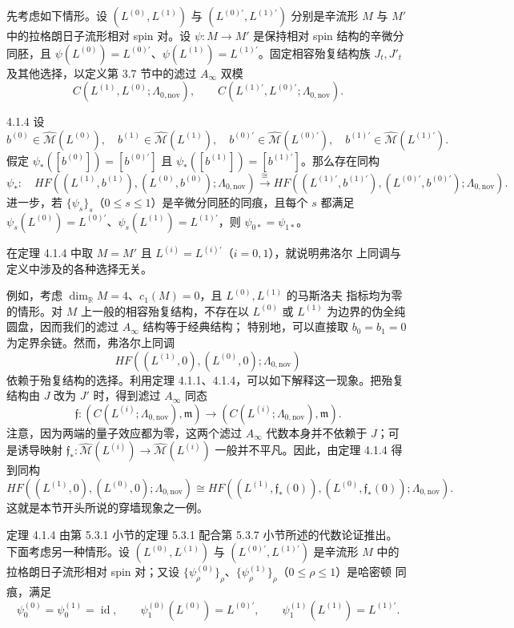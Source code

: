 先考虑如下情形。设 $(L^{(0)},L^{(1)})$ 与
$(L^{(0)'},L^{(1)'})$ 分别是辛流形 $M$ 与 $M'$ 中的拉格朗日子流形相对 spin
对。设 $\psi:M\to M'$ 是保持相对 spin 结构的辛微分同胚，且
$\psi(L^{(0)})=L^{(0)'}$、$\psi(L^{(1)})=L^{(1)'}$。固定相容殆复结构族
$J_t,J'_t$ 及其他选择，以定义第 3.7 节中的滤过 $A_\infty$ 双模
\[
  C(L^{(1)},L^{(0)};\Lambda_{0,\mathrm{nov}}),
  \qquad
  C(L^{(1)'},L^{(0)'};\Lambda_{0,\mathrm{nov}}).
\]

\begin{theorem}{4.1.4}\label{thm:4-1-4}
设
\[
  b^{(0)}\in\widehat{\mathcal M}(L^{(0)}),\quad
  b^{(1)}\in\widehat{\mathcal M}(L^{(1)}),\quad
  b^{(0)'}\in\widehat{\mathcal M}(L^{(0)'}),\quad
  b^{(1)'}\in\widehat{\mathcal M}(L^{(1)'}).
\]
假定
$\psi_*([b^{(0)}])=[b^{(0)'}]$ 且
$\psi_*([b^{(1)}])=[b^{(1)'}]$。那么存在同构
{\small
\[
  \psi_*:\quad
  HF((L^{(1)},b^{(1)}),(L^{(0)},b^{(0)});\Lambda_{0,\mathrm{nov}})
  \xrightarrow{\ \cong\ }
  HF((L^{(1)'},b^{(1)'}),(L^{(0)'},b^{(0)'});\Lambda_{0,\mathrm{nov}}).
\]
}
进一步，若 $\{\psi_s\}_s$（$0\le s\le1$）是辛微分同胚的同痕，且每个 $s$
都满足 $\psi_s(L^{(0)})=L^{(0)'}$、$\psi_s(L^{(1)})=L^{(1)'}$，则
$\psi_{0*}=\psi_{1*}$。
\end{theorem}

在定理 4.1.4 中取 $M=M'$ 且 $L^{(i)}=L^{(i)'}$（$i=0,1$），就说明弗洛尔
上同调与定义中涉及的各种选择无关。

例如，考虑 $\dim_{\mathbb R}M=4$、$c_1(M)=0$，且 $L^{(0)},L^{(1)}$ 的马斯洛夫
指标均为零的情形。对 $M$ 上一般的相容殆复结构，不存在以 $L^{(0)}$ 或
$L^{(1)}$ 为边界的伪全纯圆盘，因而我们的滤过 $A_\infty$ 结构等于经典结构；
特别地，可以直接取 $b_0=b_1=0$ 为定界余链。然而，弗洛尔上同调
\[
  HF((L^{(1)},0),(L^{(0)},0);\Lambda_{0,\mathrm{nov}})
\]
依赖于殆复结构的选择。利用定理 4.1.1、4.1.4，可以如下解释这一现象。把殆复
结构由 $J$ 改为 $J'$ 时，得到滤过 $A_\infty$ 同态
\[
  \mathfrak f:
  (C(L^{(i)};\Lambda_{0,\mathrm{nov}}),\mathfrak m)
  \longrightarrow
  (C(L^{(i)};\Lambda_{0,\mathrm{nov}}),\mathfrak m).
\]
注意，因为两端的量子效应都为零，这两个滤过 $A_\infty$ 代数本身并不依赖于
$J$；可是诱导映射
$\mathfrak f_*:\widehat{\mathcal M}(L^{(i)})\to
\widehat{\mathcal M}(L^{(i)})$ 一般并不平凡。因此，由定理 4.1.4 得到同构
\[
  HF((L^{(1)},0),(L^{(0)},0);\Lambda_{0,\mathrm{nov}})
  \cong
  HF((L^{(1)},\mathfrak f_*(0)),
     (L^{(0)},\mathfrak f_*(0));\Lambda_{0,\mathrm{nov}}).
\]
这就是本节开头所说的穿墙现象之一例。

定理 4.1.4 由第 5.3.1 小节的定理 5.3.1 配合第 5.3.7 小节所述的代数论证推出。
下面考虑另一种情形。设 $(L^{(0)},L^{(1)})$ 与
$(L^{(0)'},L^{(1)'})$ 是辛流形 $M$ 中的拉格朗日子流形相对 spin 对；又设
$\{\psi_\rho^{(0)}\}_\rho$、$\{\psi_\rho^{(1)}\}_\rho$（$0\le\rho\le1$）是哈密顿
同痕，满足
\[
  \psi_0^{(0)}=\psi_0^{(1)}=\operatorname{id},\qquad
  \psi_1^{(0)}(L^{(0)})=L^{(0)'},\qquad
  \psi_1^{(1)}(L^{(1)})=L^{(1)'}.
\]

